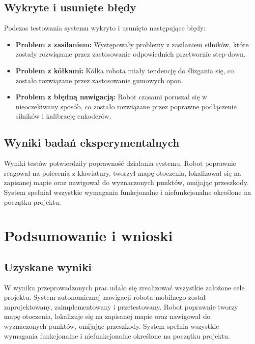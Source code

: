 \documentclass[a4paper,twoside,12pt]{book}
\begin{document}
\section{Wykryte i usunięte błędy}
Podczas testowania systemu wykryto i usunięto następujące błędy:
\begin{itemize}
	\item \textbf{Problem z zasilaniem:} Występowały problemy z zasilaniem silników, które zostały rozwiązane przez zastosowanie odpowiednich przetwornic step-down.
	\item \textbf{Problem z kółkami:} Kółka robota miały tendencję do ślizgania się, co zostało rozwiązane przez zastosowanie gumowych opon.
	\item \textbf{Problem z błędną nawigacją:} Robot czasami poruszał się w nieoczekiwany sposób, co zostało rozwiązane przez poprawne podłączenie silników i kalibrację enkoderów.
\end{itemize}

\section{Wyniki badań eksperymentalnych}
Wyniki testów potwierdziły poprawność działania systemu. Robot poprawnie reagował na polecenia z klawiatury, tworzył mapę otoczenia, lokalizował się na zapisanej mapie oraz nawigował do wyznaczonych punktów, omijając przeszkody. System spełniał wszystkie wymagania funkcjonalne i niefunkcjonalne określone na początku projektu.






\chapter{Podsumowanie i wnioski}



\section{Uzyskane wyniki}
W wyniku przeprowadzonych prac udało się zrealizować wszystkie założone cele projektu. System autonomicznej nawigacji robota mobilnego został zaprojektowany, zaimplementowany i przetestowany. Robot poprawnie tworzy mapę otoczenia, lokalizuje się na zapisanej mapie oraz nawigował do wyznaczonych punktów, omijając przeszkody. System spełnia wszystkie wymagania funkcjonalne i niefunkcjonalne określone na początku projektu.
\end{document}
